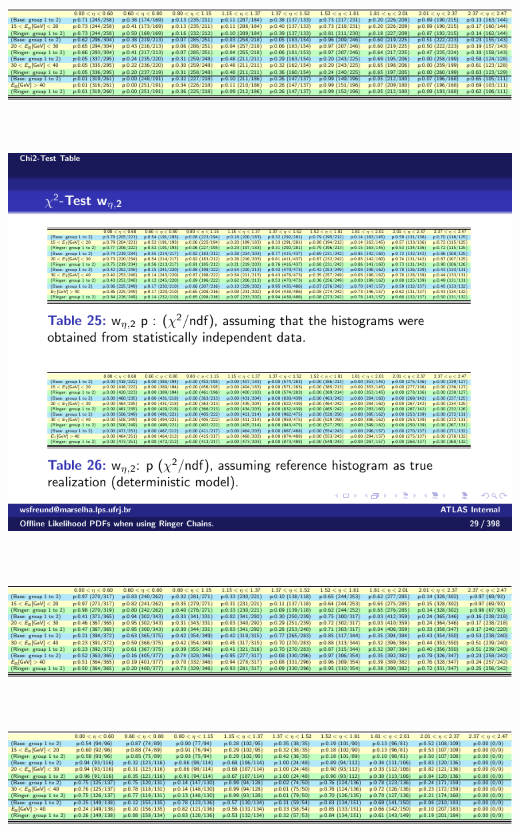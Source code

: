\begin{table}[t]\ContinuedFloat\addtocounter{table}{-1}%
\begin{subtable}{\textwidth}
\caption{\rhad{}\label{tab:p_values_rhad}}
\includegraphics[width=\textwidth]{appendices/figures/homogeneity/rhad_homogeneity_table.pdf}
\end{subtable} \\
\begin{subtable}{\textwidth}
\caption{\weta{}\label{tab:p_values_weta}}
\includegraphics[width=\textwidth]{appendices/figures/homogeneity/weta2_homogeneity_table.pdf}
\end{subtable} \\
\begin{subtable}{\textwidth}
\caption{\fI{}\label{tab:p_values_f1}}
\includegraphics[width=\textwidth]{appendices/figures/homogeneity/f1_homogeneity_table.pdf}
\end{subtable} \\
\begin{subtable}{\textwidth}
\caption{\fIII{}\label{tab:p_values_f3}}
\includegraphics[width=\textwidth]{appendices/figures/homogeneity/f3_homogeneity_table.pdf}
\end{subtable} \\
\end{table}


